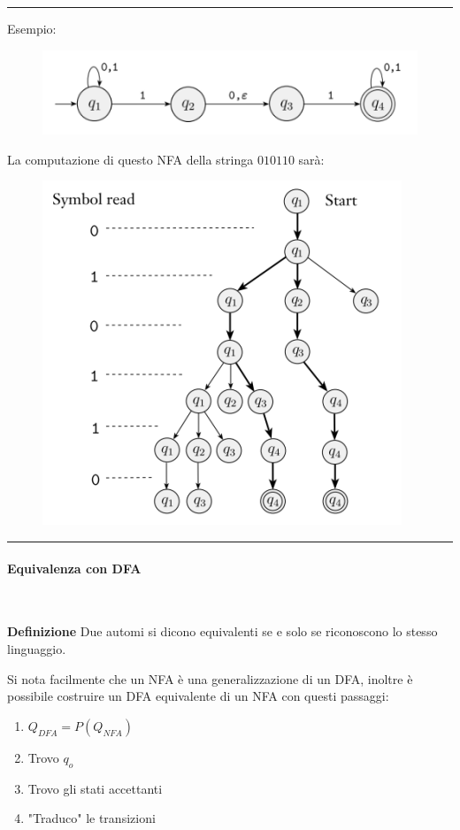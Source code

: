 \documentclass{article}
\begin{document}
\newpage

\noindent\rule{\textwidth}{0.5pt}\newline

\noindent Esempio:\newline

\begin{figure}[ht]
    \centering
    \includegraphics[width=0.65\linewidth]{NFA1.png}
    \label{fig:nfa}
\end{figure}

\noindent La computazione di questo NFA della stringa $010110$ sarà:

\begin{figure}[ht]
    \centering
    \includegraphics[width=0.6\linewidth]{NFA2.png}
    \label{fig:nfa2}
\end{figure}

\noindent\rule{\textwidth}{0.5pt}\newline

\paragraph{Equivalenza con DFA} $\ $\newline

\noindent\textbf{Definizione} Due automi si dicono equivalenti se e solo se riconoscono lo stesso linguaggio.\newline

\noindent Si nota facilmente che un NFA è una generalizzazione di un DFA, inoltre è possibile costruire un DFA equivalente di un NFA con questi passaggi:
\begin{enumerate}
    \item $Q_{DFA}=P(Q_{NFA})$
    \item Trovo $q_o$
    \item Trovo gli stati accettanti
    \item "Traduco" le transizioni
\end{enumerate}
\end{document}
